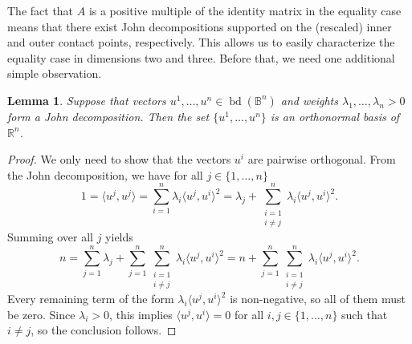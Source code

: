 \documentclass[12pt,a4paper]{article}
\newtheorem{lem}[twr]{Lemma}
\theoremstyle{definition}
\DeclareMathOperator{\bd}{bd}
\newcommand\R{\mathbb{R}}
\newcommand\B{\mathbb{B}}
\begin{document}
The fact that $A$ is a positive multiple of the identity matrix in the equality case means that there exist John decompositions supported on the (rescaled) inner and outer contact points, respectively. This allows us to easily characterize the equality case in dimensions two and three. Before that, we need one additional simple observation.



\begin{lem}
\label{lem:n_John_decomp}
Suppose that vectors $u^1, \ldots, u^n \in \bd(\B^n)$ and weights $\lambda_1, \ldots, \lambda_n > 0$ form a John decomposition. Then the set $\{ u^1, \ldots, u^n \}$ is an orthonormal basis of $\R^n$.
\end{lem}
\begin{proof}
We only need to show that the vectors $u^i$ are pairwise orthogonal. From the John decomposition, we have for all $j \in \{1, \ldots, n\}$
$$1 = \langle u^j, u^j \rangle = \sum_{i=1}^n \lambda_i \langle u^j, u^i \rangle^2 = \lambda_j + \sum_{\substack{i=1 \\ i \neq j}}^n \lambda_i \langle u^j, u^i \rangle^2.$$
Summing over all $j$ yields
$$n = \sum_{j=1}^n \lambda_j + \sum_{j=1}^n \sum_{\substack{i=1 \\ i \neq j}}^n \lambda_i \langle u^j, u^i \rangle^2 = n + \sum_{j=1}^n \sum_{\substack{i=1 \\ i \neq j}}^n \lambda_i \langle u^j, u^i \rangle^2.$$
Every remaining term of the form $\lambda_i \langle u^j, u^i \rangle^2$ is non-negative, so all of them must be zero. Since $\lambda_i > 0$, this implies $\langle u^j, u^i \rangle = 0$ for all $i,j \in \{1, \ldots, n\}$ such that $i \neq j$, so the conclusion follows.
\end{proof}
\end{document}
